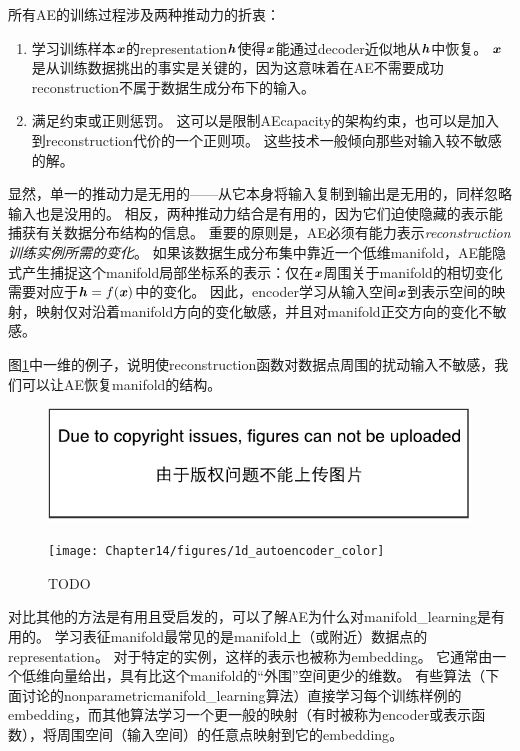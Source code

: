 
所有\gls{AE}的训练过程涉及两种推动力的折衷：
\begin{enumerate}
 \item 学习训练样本$\boldsymbol{\mathit{x}}$的\gls{representation}$\boldsymbol{\mathit{h}}$使得$\boldsymbol{\mathit{x}}$能通过\gls{decoder}近似地从$\boldsymbol{\mathit{h}}$中恢复。
$\boldsymbol{\mathit{x}}$是从训练数据挑出的事实是关键的，因为这意味着在\gls{AE}不需要成功\gls{reconstruction}不属于数据生成分布下的输入。
 \item 满足约束或正则惩罚。
这可以是限制\gls{AE}\gls{capacity}的架构约束，也可以是加入到\gls{reconstruction}代价的一个正则项。
这些技术一般倾向那些对输入较不敏感的解。
\end{enumerate}


显然，单一的推动力是无用的——从它本身将输入复制到输出是无用的，同样忽略输入也是没用的。
相反，两种推动力结合是有用的，因为它们迫使隐藏的表示能捕获有关数据分布结构的信息。
重要的原则是，\gls{AE}必须有能力表示\emph{\gls{reconstruction}训练实例所需的变化}。
如果该数据生成分布集中靠近一个低维\gls{manifold}，\gls{AE}能隐式产生捕捉这个\gls{manifold}局部坐标系的表示：仅在$\boldsymbol{\mathit{x}}$周围关于\gls{manifold}的相切变化需要对应于$\boldsymbol{\mathit{h}}=f(\boldsymbol{\mathit{x}})$中的变化。
因此，\gls{encoder}学习从输入空间$\boldsymbol{\mathit{x}}$到表示空间的映射，映射仅对沿着\gls{manifold}方向的变化敏感，并且对\gls{manifold}正交方向的变化不敏感。


图\ref{fig:chap14_1d_autoencoder_color}中一维的例子，说明使\gls{reconstruction}函数对数据点周围的扰动输入不敏感，我们可以让\gls{AE}恢复\gls{manifold}的结构。

\begin{figure}[!htb]
\ifOpenSource
\centerline{\includegraphics{figure.pdf}}
\else
\centerline{\texttt{[image: Chapter14/figures/1d\_autoencoder\_color]}}
\fi
\caption{TODO}
\label{fig:chap14_1d_autoencoder_color}
\end{figure}


对比其他的方法是有用且受启发的，可以了解\gls{AE}为什么对\gls{manifold_learning}是有用的。
学习表征\gls{manifold}最常见的是\gls{manifold}上（或附近）数据点的\gls{representation}。
对于特定的实例，这样的表示也被称为\gls{embedding}。
它通常由一个低维向量给出，具有比这个\gls{manifold}的``外围''空间更少的维数。
有些算法（下面讨论的\gls{nonparametric}\gls{manifold_learning}算法）直接学习每个训练样例的\gls{embedding}，而其他算法学习一个更一般的映射（有时被称为\gls{encoder}或表示函数），将周围空间（输入空间）的任意点映射到它的\gls{embedding}。



